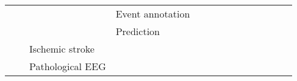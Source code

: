 \begin{tabular}{p{1.5cm}p{1.5cm}p{1.5cm}p{1.5cm}p{0.6cm}p{0.6cm}p{0.6cm}p{0.6cm}p{0.6cm}p{0.6cm}p{0.6cm}p{0.6cm}p{0.6cm}p{0.6cm}}
                                &                 &                   & Event annotation &                                                             &                                                                                                                             &                                                                        &                                      &                                                            &                      &      \cite{Yang2016b} &                                 &                         &                                                                      \\
                                &                 &                   & Prediction &                                                             &                                                                                                 \cite{Truong2018, Page2016} &                                                                        &                                      &                                                            &                      &                       &              \cite{Truong2018a} &                         &                                                  \cite{Tsiouris2018} \\
                                &                 & Ischemic stroke &   &                                                             &                                                                                                            \cite{Giri2016a} &                                                                        &                                      &                                                            &                      &                       &                                 &                         &                                                                      \\
                                &                 & Pathological EEG &   &                                                             &                                                                                                   \cite{Schirrmeister2017a} &                                                         \cite{Roy2018} &                                      &                                                            &                      &                       &                                 &                         &                                                                      \\

\end{tabular}
